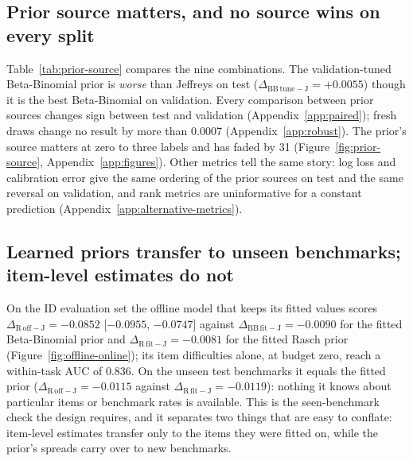 \documentclass{article}
\newcommand{\D}[2]{\ensuremath{\Delta_{\mathrm{#1}-\mathrm{#2}}}}
\begin{document}
\subsection{Prior source matters, and no source wins on every split}

Table~\ref{tab:prior-source} compares the nine combinations. The validation-tuned Beta-Binomial prior is \emph{worse} than Jeffreys on test ($\D{BB\,tune}{J}=+0.0055$) though it is the best Beta-Binomial on validation. Every comparison between prior sources changes sign between test and validation (Appendix~\ref{app:paired}); fresh draws change no result by more than $0.0007$ (Appendix~\ref{app:robust}). The prior's source matters at zero to three labels and has faded by 31 (Figure~\ref{fig:prior-source}, Appendix~\ref{app:figures}). Other metrics tell the same story: log loss and calibration error give the same ordering of the prior sources on test and the same reversal on validation, and rank metrics are uninformative for a constant prediction (Appendix~\ref{app:alternative-metrics}).

\begin{table}[!t]
  \caption{\textbf{A prior fitted on training helps on the test benchmarks and hurts on the validation benchmarks; a fixed prior with strong shrinkage does nearly as well on test.} Each cell is $\Delta_{m-\mathrm{J}}$ for the model $m$ in the row, competition-shaped draws. ID: held-out subjects on the 11 training benchmarks, 114 tasks, where the training-fitted Beta-Binomial prior is refit without those subjects. OOD validation: 3 unseen benchmarks, 80 tasks. OOD test: 3 unseen benchmarks, 45 tasks. Bold: best of the nine models in each column; underlined: second best.}\label{tab:prior-source}
  \centering\footnotesize\setlength{\tabcolsep}{0.75pt}
  
\end{table}

\subsection{Learned priors transfer to unseen benchmarks; item-level estimates do not}

On the ID evaluation set the offline model that keeps its fitted values scores $\D{R\,off}{J}=-0.0852$ [$-0.0955$, $-0.0747$] against $\D{BB\,fit}{J}=-0.0090$ for the fitted Beta-Binomial prior and $\D{R\,fit}{J}=-0.0081$ for the fitted Rasch prior (Figure~\ref{fig:offline-online}); its item difficulties alone, at budget zero, reach a within-task AUC of $0.836$. On the unseen test benchmarks it equals the fitted prior ($\D{R\,off}{J}=-0.0115$ against $\D{R\,fit}{J}=-0.0119$): nothing it knows about particular items or benchmark rates is available. This is the seen-benchmark check the design requires, and it separates two things that are easy to conflate: item-level estimates transfer only to the items they were fitted on, while the prior's spreads carry over to new benchmarks.
\end{document}
